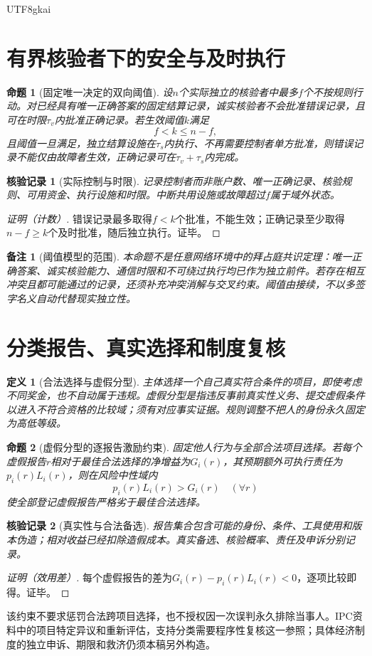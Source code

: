 \documentclass[12pt,a4paper,openany]{report}
\newtheorem{definition}{定义}[chapter]
\newtheorem{proposition}{命题}[chapter]
\newtheorem{remark}{备注}[chapter]
\newtheorem{Certificate}{核验记录}[chapter]
\begin{document}
\begin{CJK*}{UTF8}{gkai}
\section{有界核验者下的安全与及时执行}
\begin{proposition}[固定唯一决定的双向阈值]
\label{prop:quorum}
设$n$个实际独立的核验者中最多$f$个不按规则行动。对已经具有唯一正确答案的固定结算记录，诚实核验者不会批准错误记录，且可在时限$\tau_v$内批准正确记录。若生效阈值$k$满足
\[
 f<k\le n-f,
\]
且阈值一旦满足，独立结算设施在$\tau_s$内执行、不再需要控制者单方批准，则错误记录不能仅由故障者生效，正确记录可在$\tau_v+\tau_s$内完成。
\end{proposition}
\begin{Certificate}[实际控制与时限]
记录控制者而非账户数、唯一正确记录、核验规则、可用资金、执行设施和时限。中断共用设施或故障超过$f$属于域外状态。
\end{Certificate}
\begin{proof}[证明（计数）]
错误记录最多取得$f<k$个批准，不能生效；正确记录至少取得$n-f\ge k$个及时批准，随后独立执行。证毕。
\end{proof}
\begin{remark}[阈值模型的范围]
本命题不是任意网络环境中的拜占庭共识定理：唯一正确答案、诚实核验能力、通信时限和不可绕过执行均已作为独立前件。若存在相互冲突且都可能通过的记录，还须补充冲突消解与交叉约束。阈值由\cite[“有限偏离域中的安全阈值与到期阈值”相关构造]{SourcePreference}接续，不以多签字名义自动代替现实独立性。
\end{remark}

\section{分类报告、真实选择和制度复核}
\begin{definition}[合法选择与虚假分型]
主体选择一个自己真实符合条件的项目，即使考虑不同奖金，也不自动属于违规。虚假分型是指违反事前真实性义务、提交虚假条件以进入不符合资格的比较域；须有对应事实证据。规则调整不把人的身份永久固定为高低等级。
\end{definition}
\begin{proposition}[虚假分型的逐报告激励约束]
\label{prop:misreport}
固定他人行为与全部合法项目选择。若每个虚假报告$r$相对于最佳合法选择的净增益为$G_i(r)$，其预期额外可执行责任为$p_i(r)L_i(r)$，则在风险中性域内
\[
 p_i(r)L_i(r)>G_i(r)\quad(\forall r)
\]
使全部登记虚假报告严格劣于最佳合法选择。
\end{proposition}
\begin{Certificate}[真实性与合法备选]
报告集合包含可能的身份、条件、工具使用和版本伪造；相对收益已经扣除造假成本。真实备选、核验概率、责任及申诉分别记录。
\end{Certificate}
\begin{proof}[证明（效用差）]
每个虚假报告的差为$G_i(r)-p_i(r)L_i(r)<0$，逐项比较即得。证毕。
\end{proof}
该约束不要求惩罚合法跨项目选择，也不授权因一次误判永久排除当事人。IPC资料中的项目特定异议和重新评估，支持分类需要程序性复核这一参照\cite{IPCClassification}；具体经济制度的独立申诉、期限和救济仍须本稿另外构造。

\end{CJK*}
\end{document}
